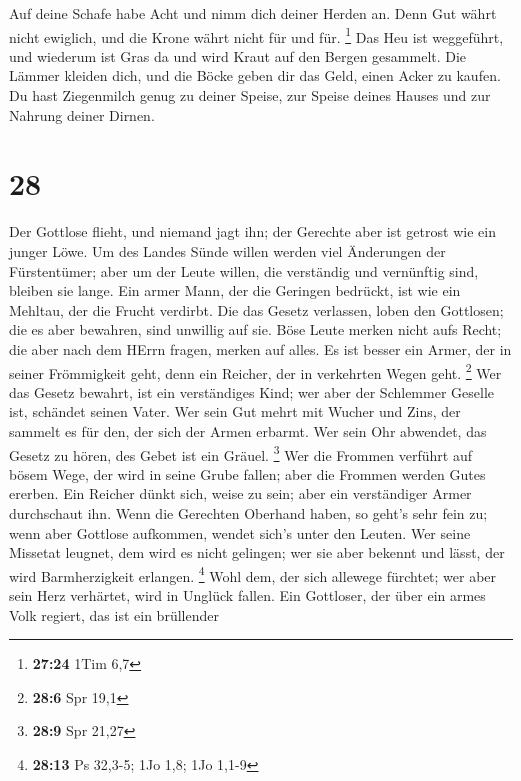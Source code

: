  Auf deine Schafe habe Acht und nimm dich deiner Herden
an.  Denn Gut währt nicht ewiglich, und die Krone währt
nicht für und für. \footnote{\textbf{27:24} 1Tim 6,7} 
Das Heu ist weggeführt, und wiederum ist Gras da und wird Kraut auf den
Bergen gesammelt.  Die Lämmer kleiden dich, und die Böcke
geben dir das Geld, einen Acker zu kaufen.  Du hast
Ziegenmilch genug zu deiner Speise, zur Speise deines Hauses und zur
Nahrung deiner Dirnen.

\hypertarget{section-27}{%
\section{28}\label{section-27}}

 Der Gottlose flieht, und niemand jagt ihn; der Gerechte
aber ist getrost wie ein junger Löwe.  Um des Landes Sünde
willen werden viel Änderungen der Fürstentümer; aber um der Leute
willen, die verständig und vernünftig sind, bleiben sie lange.
 Ein armer Mann, der die Geringen bedrückt, ist wie ein
Mehltau, der die Frucht verdirbt.  Die das Gesetz
verlassen, loben den Gottlosen; die es aber bewahren, sind unwillig auf
sie.  Böse Leute merken nicht aufs Recht; die aber nach
dem HErrn fragen, merken auf alles.  Es ist besser ein
Armer, der in seiner Frömmigkeit geht, denn ein Reicher, der in
verkehrten Wegen geht. \footnote{\textbf{28:6} Spr 19,1} 
Wer das Gesetz bewahrt, ist ein verständiges Kind; wer aber der
Schlemmer Geselle ist, schändet seinen Vater.  Wer sein
Gut mehrt mit Wucher und Zins, der sammelt es für den, der sich der
Armen erbarmt.  Wer sein Ohr abwendet, das Gesetz zu
hören, des Gebet ist ein Gräuel. \footnote{\textbf{28:9} Spr 21,27}
 Wer die Frommen verführt auf bösem Wege, der wird in
seine Grube fallen; aber die Frommen werden Gutes ererben.
 Ein Reicher dünkt sich, weise zu sein; aber ein
verständiger Armer durchschaut ihn.  Wenn die Gerechten
Oberhand haben, so geht's sehr fein zu; wenn aber Gottlose aufkommen,
wendet sich's unter den Leuten.  Wer seine Missetat
leugnet, dem wird es nicht gelingen; wer sie aber bekennt und lässt, der
wird Barmherzigkeit erlangen. \footnote{\textbf{28:13} Ps 32,3-5; 1Jo
  1,8; 1Jo 1,1-9}  Wohl dem, der sich allewege fürchtet;
wer aber sein Herz verhärtet, wird in Unglück fallen. 
Ein Gottloser, der über ein armes Volk regiert, das ist ein brüllender
